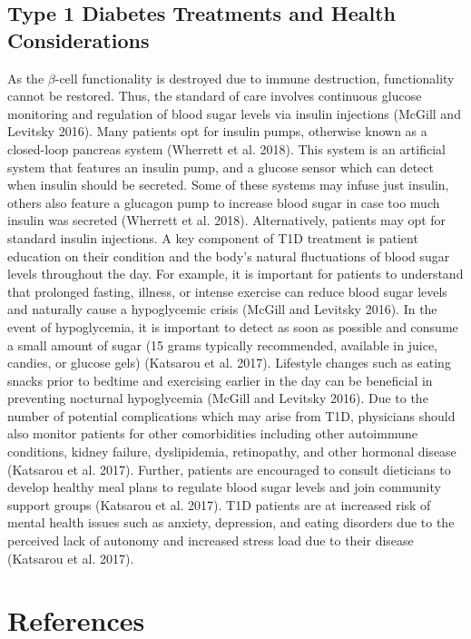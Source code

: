 \documentclass{article}
\begin{document}
\subsection{Type 1 Diabetes Treatments and Health Considerations}
As the $\beta$-cell functionality is destroyed due to immune destruction, functionality cannot be restored. Thus, the standard
of care involves continuous glucose monitoring and regulation of blood sugar levels via insulin injections (McGill and Levitsky
2016). Many patients opt for insulin pumps, otherwise known as a closed-loop pancreas system (Wherrett et al. 2018). This
system is an artificial system that features an insulin pump, and a glucose sensor which can detect when insulin should be
secreted. Some of these systems may infuse just insulin, others also feature a glucagon pump to increase blood sugar in case
too much insulin was secreted (Wherrett et al. 2018). Alternatively, patients may opt for standard insulin injections. A key
component of T1D treatment is patient education on their condition and the body’s natural fluctuations of blood sugar levels
throughout the day. For example, it is important for patients to understand that prolonged fasting, illness, or intense exercise can
reduce blood sugar levels and naturally cause a hypoglycemic crisis (McGill and Levitsky 2016). In the event of hypoglycemia,
it is important to detect as soon as possible and consume a small amount of sugar (15 grams typically recommended, available
in juice, candies, or glucose gels) (Katsarou et al. 2017). Lifestyle changes such as eating snacks prior to bedtime and exercising
earlier in the day can be beneficial in preventing nocturnal hypoglycemia (McGill and Levitsky 2016). Due to the number of
potential complications which may arise from T1D, physicians should also monitor patients for other comorbidities including
other autoimmune conditions, kidney failure, dyslipidemia, retinopathy, and other hormonal disease (Katsarou et al. 2017).
Further, patients are encouraged to consult dieticians to develop healthy meal plans to regulate blood sugar levels and join
community support groups (Katsarou et al. 2017). T1D patients are at increased risk of mental health issues such as anxiety,
depression, and eating disorders due to the perceived lack of autonomy and increased stress load due to their disease (Katsarou
et al. 2017).

\clearpage\newpage
\section{References}


\nocite{*}
\printbibliography[heading=none, sorting=nyt]
\newpage
\end{document}
